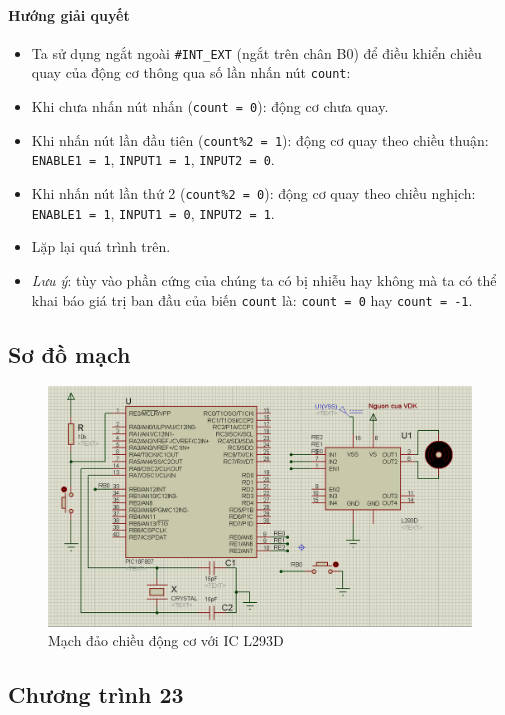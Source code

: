 \paragraph{Hướng giải quyết}
\begin{itemize}
\item Ta sử dụng ngắt ngoài \verb|#INT_EXT| (ngắt trên chân B0) để điều khiển chiều quay của động cơ thông qua số lần nhấn nút \verb|count|:
\item Khi chưa nhấn nút nhấn (\verb|count = 0|): động cơ chưa quay.
\item Khi nhấn nút lần đầu tiên (\verb|count%2 = 1|): động cơ quay theo chiều thuận: \verb|ENABLE1 = 1|, \verb|INPUT1 = 1|, \verb|INPUT2 = 0|.
\item Khi nhấn nút lần thứ 2 (\verb|count%2 = 0|): động cơ quay theo chiều nghịch: \verb|ENABLE1 = 1|, \verb|INPUT1 = 0|, \verb|INPUT2 = 1|.
\item Lặp lại quá trình trên.
\item \textit{Lưu ý}: tùy vào phần cứng của chúng ta có bị nhiễu hay không mà ta có thể khai báo giá trị ban đầu của biến \verb|count| là: \verb|count = 0| hay \verb|count = -1|.
\end{itemize}
\newpage
\subsection*{Sơ đồ mạch}
\begin{figure}[!h]
\begin{center}
\includegraphics[scale=0.5]{bai-8/image/BAI-8-1}
\end{center}
\caption{Mạch đảo chiều động cơ với IC L293D}
\label{Fig:dao-chieu}
\end{figure}
\subsection*{Chương trình 23}

